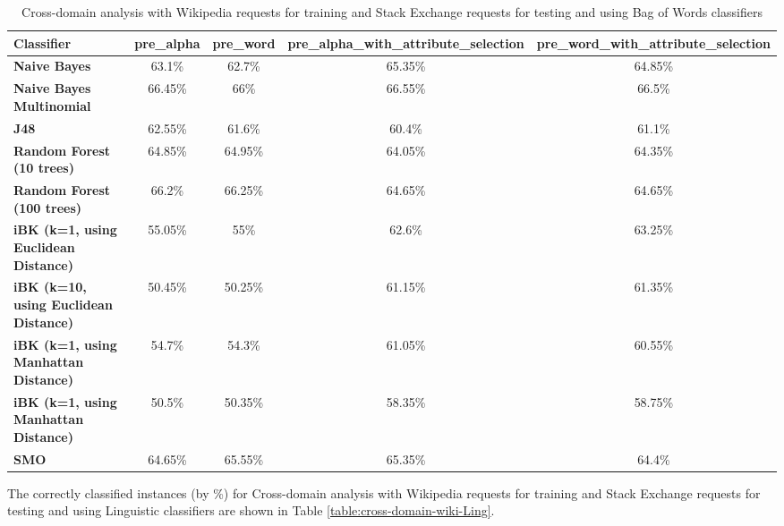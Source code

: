 \documentclass[conference]{IEEEtran}
\begin{document}
\begin{table*}[htbp]
\caption{Cross-domain analysis with Wikipedia requests for training and Stack Exchange requests for testing and using Bag of Words classifiers }
\centering
\vspace{5pt}
\begin{tabular}{|l|c|c|c|c|}
\hline
\textbf{Classifier} & \textbf{pre\_alpha} & \textbf{pre\_word} & \textbf{pre\_alpha\_with\_attribute\_selection} & \textbf{pre\_word\_with\_attribute\_selection} \\
\hline\hline
\textbf{Naive Bayes} & 63.1\% & 62.7\% & 65.35\% & 64.85\% \\ 
\hline
\textbf{Naive Bayes Multinomial} & 66.45\% & 66\% & 66.55\% & 66.5\% \\ 
\hline
\textbf{J48} & 62.55\% & 61.6\% & 60.4\% & 61.1\% \\ 
\hline
\textbf{Random Forest (10 trees)} & 64.85\% & 64.95\% & 64.05\% & 64.35\% \\ 
\hline
\textbf{Random Forest (100 trees)} & 66.2\% & 66.25\% & 64.65\% & 64.65\% \\ 
\hline
\textbf{iBK (k=1, using Euclidean Distance)} & 55.05\% & 55\% & 62.6\% & 63.25\% \\ 
\hline
\textbf{iBK (k=10, using Euclidean Distance)} & 50.45\% & 50.25\% & 61.15\% & 61.35\% \\ 
\hline
\textbf{iBK (k=1, using Manhattan Distance)} & 54.7\% & 54.3\% & 61.05\% & 60.55\% \\ 
\hline
\textbf{iBK (k=1, using Manhattan Distance)} & 50.5\% & 50.35\% & 58.35\% & 58.75\% \\ 
\hline
\textbf{SMO} & 64.65\% & 65.55\% & 65.35\% & 64.4\% \\ 
\hline
\hline
\end{tabular}
\label{table:cross-domain-wiki-BOW}
\end{table*}

The correctly classified instances (by \%) for Cross-domain analysis with Wikipedia requests for training and Stack Exchange requests for testing and using Linguistic classifiers are shown in Table \ref{table:cross-domain-wiki-Ling}.
\end{document}

